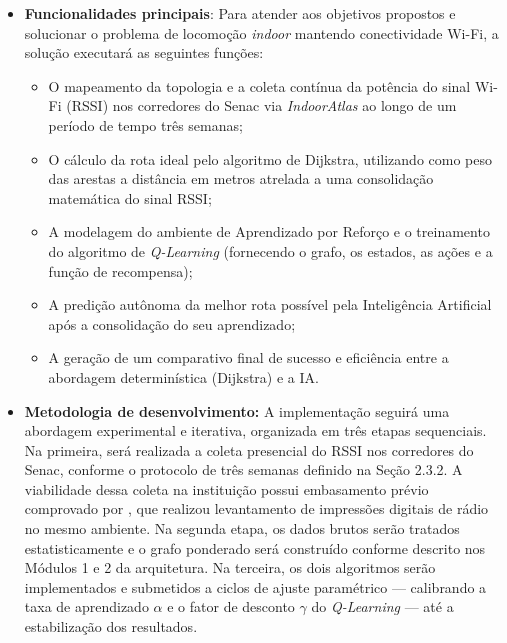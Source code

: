 \documentclass[
    12pt,                %
    openright,           %
    oneside,             %
    a4paper,             %
    english,             %
    brazil               %
]{abntex2}
\begin{document}
\begin{itemize}
    \item \textbf{Funcionalidades principais}: Para atender aos objetivos propostos e solucionar o problema de locomoção \textit{indoor} mantendo conectividade Wi-Fi, a solução executará as seguintes funções:
    \begin{itemize}
        \item O mapeamento da topologia e a coleta contínua da potência do sinal Wi-Fi (RSSI) nos corredores do Senac via \textit{IndoorAtlas} ao longo de um período de tempo três semanas;
        \item O cálculo da rota ideal pelo algoritmo de Dijkstra, utilizando como peso das arestas a distância em metros atrelada a uma consolidação matemática do sinal RSSI;
        \item A modelagem do ambiente de Aprendizado por Reforço e o treinamento do algoritmo de \textit{Q-Learning} (fornecendo o grafo, os estados, as ações e a função de recompensa);
        \item A predição autônoma da melhor rota possível pela Inteligência Artificial após a consolidação do seu aprendizado;
        \item A geração de um comparativo final de sucesso e eficiência entre a abordagem determinística (Dijkstra) e a IA.
    \end{itemize}
\item \textbf{Metodologia de desenvolvimento:} A implementação seguirá uma
abordagem experimental e iterativa, organizada em três etapas sequenciais. Na
primeira, será realizada a coleta presencial do RSSI nos corredores do Senac,
conforme o protocolo de três semanas definido na Seção 2.3.2. A viabilidade dessa
coleta na instituição possui embasamento prévio comprovado por ,
que realizou levantamento de impressões digitais de rádio no mesmo ambiente. Na
segunda etapa, os dados brutos serão tratados estatisticamente e o grafo ponderado
será construído conforme descrito nos Módulos 1 e 2 da arquitetura. Na terceira,
os dois algoritmos serão implementados e submetidos a ciclos de ajuste paramétrico
--- calibrando a taxa de aprendizado $\alpha$ e o fator de desconto $\gamma$ do
\textit{Q-Learning} --- até a estabilização dos resultados.


\end{itemize}
\end{document}
